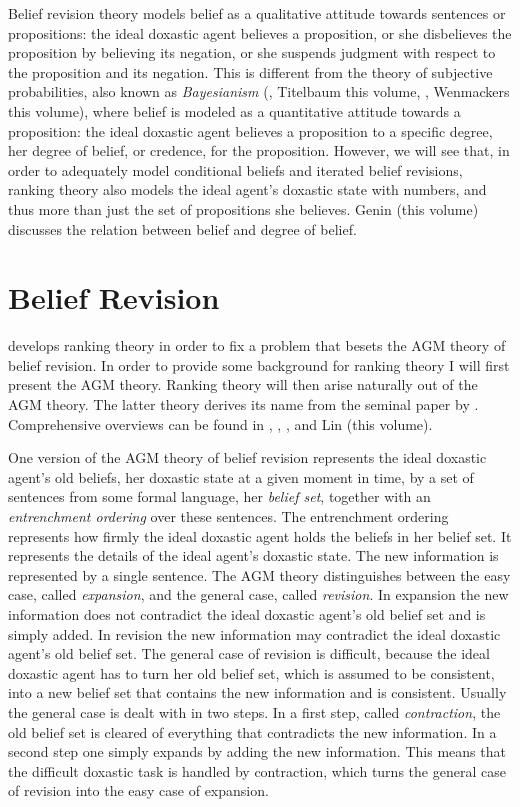 Belief revision theory models belief as a qualitative attitude towards sentences or propositions: the ideal doxastic agent believes a proposition, or she disbelieves the proposition by believing its negation, or she suspends judgment with respect to the proposition and its negation. This is different from the theory of subjective probabilities, also known as \emph{Bayesianism} (\citealt{e11, e11b}, Titelbaum this volume, \citealt{w11}, Wenmackers this volume), where belief is modeled as a quantitative attitude towards a proposition: the ideal doxastic agent believes a proposition to a specific degree, her degree of belief, or credence, for the proposition. However, we will see that, in order to adequately model conditional beliefs and iterated belief revisions, ranking theory also models the ideal agent's doxastic state with numbers, and thus more than just the set of propositions she believes. Genin (this volume) discusses the relation between belief and degree of belief.

\section{Belief Revision}

\citet{s88,s90} develops ranking theory in order to fix a problem that besets the AGM theory of belief revision. In order to provide some background for ranking theory I will first present the AGM theory. Ranking theory will then arise naturally out of the AGM theory. The latter theory derives its name from the seminal paper by \citet{agm85}. Comprehensive overviews can be found in \citet{g88b}, \citet{gr95}, \citet{r01}, and Lin (this volume).

One version of the AGM theory of belief revision represents the ideal doxastic agent's old beliefs, her doxastic state at a given moment in time, by a set of sentences from some formal language, her \emph{belief set}, together with an \emph{entrenchment ordering} over these sentences. The entrenchment ordering represents how firmly the ideal doxastic agent holds the beliefs in her belief set. It represents the details of the ideal agent's doxastic state. The new information is represented by a single sentence. The AGM theory distinguishes between the easy case, called \emph{expansion}, and the general case, called \emph{revision}. In expansion the new information does not contradict the ideal doxastic agent's old belief set and is simply added. In revision the new information may contradict the ideal doxastic agent's old belief set. The general case of revision is difficult, because the ideal doxastic agent has to turn her old belief set, which is assumed to be consistent, into a new belief set that contains the new information and is consistent. Usually the general case is dealt with in two steps. In a first step, called \emph{contraction}, the old belief set is cleared of everything that contradicts the new information. In a second step one simply expands by adding the new information. This means that the difficult doxastic task is handled by contraction, which turns the general case of revision into the easy case of expansion.

